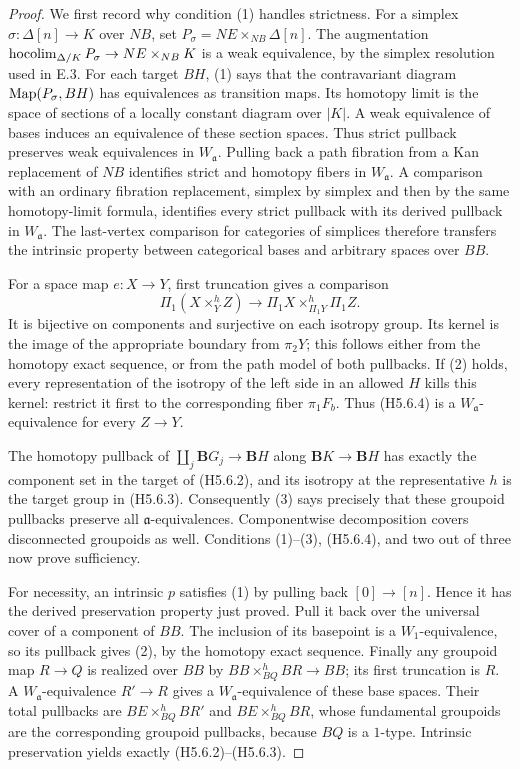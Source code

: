 \begin{proof}
We first record why condition (1) handles strictness.
For a simplex $\sigma:\Delta[n]\to K$ over $NB$, set
$P_\sigma=NE\times_{NB}\Delta[n]$. The augmentation
$\operatorname*{hocolim}_{\Delta/K}P_\sigma\to NE\times_{NB}K$ is a weak
equivalence, by the simplex resolution used in E.3.
For each target $BH$, (1) says that the contravariant
diagram $\operatorname{Map}(P_\sigma,BH)$ has equivalences as transition
maps. Its homotopy limit is the space of sections of a
locally constant diagram over $|K|$. A weak equivalence
of bases induces an equivalence of these section spaces.
Thus strict pullback preserves weak equivalences in
$W_{\mathfrak a}$. Pulling back a path fibration from a
Kan replacement of $NB$ identifies strict and homotopy
fibers in $W_{\mathfrak a}$. A comparison with an ordinary
fibration replacement, simplex by simplex and then by
the same homotopy-limit formula, identifies every strict
pullback with its derived pullback in $W_{\mathfrak a}$.
The last-vertex comparison for categories of simplices
therefore transfers the intrinsic property between
categorical bases and arbitrary spaces over $BB$.

For a space map $e:X\to Y$, first truncation gives a
comparison
\[
 \Pi_1(X\times_Y^h Z)\longrightarrow
   \Pi_1X\times_{\Pi_1Y}^h\Pi_1Z.                        \tag{H5.6.4}
\]
It is bijective on components and surjective on each
isotropy group. Its kernel is the image of the appropriate
boundary from $\pi_2Y$; this follows either from the
homotopy exact sequence, or from the path model of both
pullbacks. If (2) holds, every representation of the
isotropy of the left side in an allowed $H$ kills this
kernel: restrict it first to the corresponding fiber
$\pi_1F_b$. Thus (H5.6.4) is a $W_{\mathfrak a}$-equivalence
for every $Z\to Y$.

The homotopy pullback of
$\coprod_j\mathbf BG_j\to\mathbf BH$ along
$\mathbf BK\to\mathbf BH$ has exactly the component set
in the target of (H5.6.2), and its isotropy at the
representative $h$ is the target group in (H5.6.3).
Consequently (3) says precisely that these groupoid
pullbacks preserve all $\mathfrak a$-equivalences.
Componentwise decomposition covers disconnected
groupoids as well. Conditions (1)--(3), (H5.6.4), and
two out of three now prove sufficiency.

For necessity, an intrinsic $p$ satisfies (1) by pulling
back $[0]\to[n]$. Hence it has the derived preservation
property just proved. Pull it back over the universal
cover of a component of $BB$. The inclusion of its
basepoint is a $W_1$-equivalence, so its pullback gives
(2), by the homotopy exact sequence.
Finally any groupoid map $R\to Q$ is realized over $BB$
by $BB\times_{BQ}^h BR\to BB$; its first truncation is
$R$. A $W_{\mathfrak a}$-equivalence $R'\to R$ gives a
$W_{\mathfrak a}$-equivalence of these base spaces.
Their total pullbacks are $BE\times_{BQ}^h BR'$ and
$BE\times_{BQ}^h BR$, whose fundamental groupoids are
the corresponding groupoid pullbacks, because $BQ$
is a $1$-type. Intrinsic preservation yields exactly
(H5.6.2)--(H5.6.3).
\end{proof}

